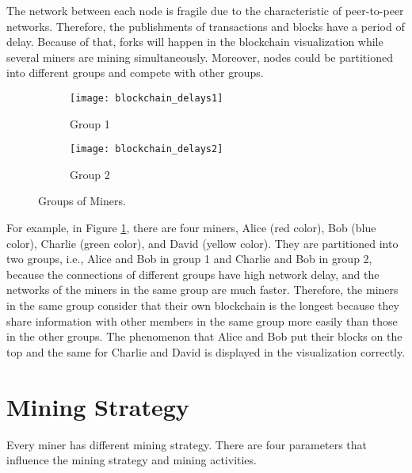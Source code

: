 The network between each node is fragile due to the characteristic of peer-to-peer networks. Therefore, the publishments of transactions and blocks have a period of delay. Because of that, forks will happen in the blockchain visualization while several miners are mining simultaneously. Moreover, nodes could be partitioned into different groups and compete with other groups.

\begin{figure}[htb]
    \centering
    \begin{subfigure}[b]{1\textwidth}
        \centering
        \texttt{[image: blockchain\_delays1]}
        \caption{Group 1}
    \end{subfigure}
    
    \begin{subfigure}[b]{1\textwidth}
        \centering
        \texttt{[image: blockchain\_delays2]}
        \caption{Group 2}
    \end{subfigure}

    \caption{Groups of Miners.}
    \label{fig:groups of miners}
\end{figure}

For example, in Figure \ref{fig:groups of miners}, there are four miners, Alice (red color), Bob (blue color), Charlie (green color), and David (yellow color). They are partitioned into two groups, i.e., Alice and Bob in group 1 and Charlie and Bob in group 2, because the connections of different groups have high network delay, and the networks of the miners in the same group are much faster. Therefore, the miners in the same group consider that their own blockchain is the longest because they share information with other members in the same group more easily than those in the other groups. The phenomenon that Alice and Bob put their blocks on the top and the same for Charlie and David is displayed in the visualization correctly.

\clearpage

\section{Mining Strategy}

Every miner has different mining strategy. There are four parameters that influence the mining strategy and mining activities. 

